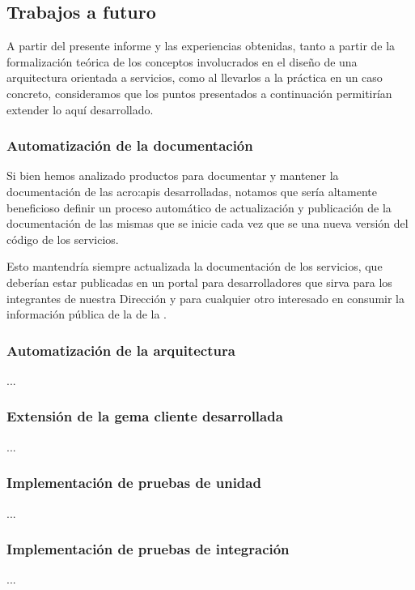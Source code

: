 \subsection{Trabajos a futuro}
\label{trabajos-a-futuro}

A partir del presente informe y las experiencias obtenidas, tanto a partir de la formalización teórica de los conceptos involucrados en el diseño de una arquitectura orientada a servicios, como al llevarlos a la práctica en un caso concreto, consideramos que los puntos presentados a continuación permitirían extender lo aquí desarrollado.

\subsubsection{Automatización de la documentación}

Si bien hemos analizado productos para documentar y mantener la documentación de las \glspl{acro:api} desarrolladas, notamos que sería altamente beneficioso definir un proceso automático de actualización y publicación de la documentación de las mismas que se inicie cada vez que se  una nueva versión del código de los servicios.

Esto mantendría siempre actualizada la documentación de los servicios, que deberían estar publicadas en un portal para desarrolladores que sirva para los integrantes de nuestra Dirección y para cualquier otro interesado en consumir la información pública de la {\cloud} de la {\unlp}.

\subsubsection{Automatización de la arquitectura}

...

\subsubsection{Extensión de la gema cliente desarrollada}

...

\subsubsection{Implementación de pruebas de unidad}

...

\subsubsection{Implementación de pruebas de integración}

...
